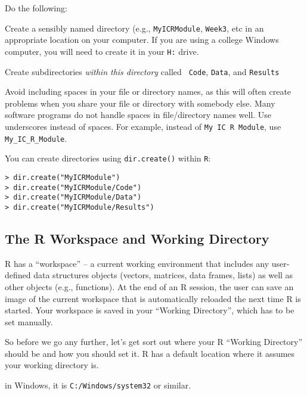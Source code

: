 Do the following:
\begin{compactitem}[$\quad\star$]
	\item Create a sensibly named directory (e.g., {\tt MyICRModule}, {\tt Week3}, etc in an 
	appropriate location on your computer. If you are using a college Windows 
	computer, you will need to create it in your {\tt H:} drive.  
	 
	\item Create subdirectories {\it within this directory} called {\tt 
	Code}, {\tt Data}, and {\tt Results}
\end{compactitem}

\begin{tipbox}
	Avoid including spaces in your file or directory names, as this will 
	often create problems when you share your file or directory with 
	somebody else. Many software programs do not handle spaces in 
	file/directory names well. Use underscores instead of spaces. For 
	example, instead of {\tt My IC R Module}, use {\tt 
	My\_IC\_R\_Module}.  
	
\end{tipbox}

You can create directories using {\tt dir.create()} within {\tt R}:

\begin{lstlisting}
> dir.create("MyICRModule")
> dir.create("MyICRModule/Code")
> dir.create("MyICRModule/Data")	
> dir.create("MyICRModule/Results")	
\end{lstlisting}

\subsection{The R Workspace and Working Directory}

R has a ``workspace'' -- a current working environment that includes 
any user-defined data structures objects (vectors, matrices, data 
frames, lists) as well as other objects (e.g., functions). At the end 
of an R session, the user can save an image of the current workspace 
that is automatically reloaded the next time R is started. Your 
workspace is saved in your ``Working Directory'', which has to be set 
manually.

So before we go any further, let's get sort out where your R ``Working 
Directory'' should be and how you should set it. R has a default 
location where it assumes your working directory is. 

in Windows, it is {\tt C:/Windows/system32} or similar.

